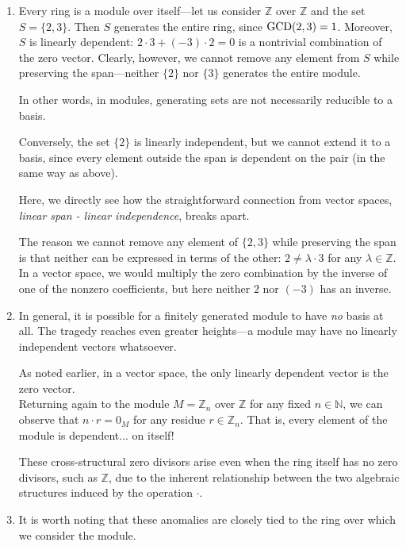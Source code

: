 \documentclass{article}
\newif\ifusemulticols
\theoremstyle{definition}
\theoremstyle{remark}
\theoremstyle{plain}
\theoremstyle{plain}
\newenvironment{mymulticols}
    { \ifusemulticols \begin{multicols}{2} \fi }
    { \ifusemulticols \end{multicols} \fi }
\newcommand{\N}{\mathbb{N}}
\newcommand{\Z}{\mathbb{Z}}
\begin{document}
\begin{mymulticols}
\begin{enumerate}
    \item Every ring is a module over itself—let us consider $\Z$ over $\Z$ and the set $S = \{2,
        3\}$.
        Then $S$ generates the entire ring, since $\textnormal{GCD}(2, 3) = 1$. Moreover, $S$ is
        linearly dependent: $2 \cdot 3 + (-3) \cdot 2 = 0$ is a nontrivial combination of the zero vector.
        Clearly, however, we cannot remove any element from $S$ while preserving the span—neither
        $\{2\}$ nor $\{3\}$ generates the entire module.

        In other words, in modules, generating sets are not necessarily reducible to a basis.

        Conversely, the set $\{2\}$ is linearly independent, but we cannot extend it to a basis,
        since every element outside the span is dependent on the pair (in the same way as above).

        Here, we directly see how the straightforward connection from vector spaces, \textit{
        linear span - linear independence}, breaks apart.

        The reason we cannot remove any element of $\{2, 3\}$ while preserving the span is that
        neither can be expressed in terms of the other: $2 \neq \lambda \cdot 3$ for any $\lambda
        \in \Z$.
        In a vector space, we would multiply the zero combination by the inverse of one of the
        nonzero coefficients, but here neither $2$ nor $(-3)$ has an inverse.

    \item In general, it is possible for a finitely generated module to have \emph{no} basis at all.
        The tragedy reaches even greater heights—a module may have no linearly independent vectors
        whatsoever.

        As noted earlier, in a vector space, the only linearly dependent vector is the zero
        vector.\\ Returning again to the module $M = \Z_n$ over $\Z$ for any fixed $n \in \N$, we
        can observe that $n \cdot r = 0_M$ for any residue $r \in \Z_n$. That is, every element of
        the module is dependent... on itself!

        These cross-structural zero divisors arise even when the ring itself has no zero divisors,
        such as $\Z$, due to the inherent relationship between the two algebraic structures induced by
        the operation $\cdot$.

    \item It is worth noting that these anomalies are closely tied to the ring over which we
        consider the module.


\end{enumerate}
\end{mymulticols}
\end{document}
